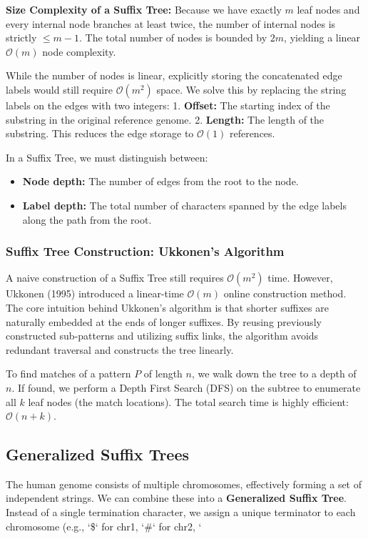 \documentclass[11pt,a4paper]{article}
\begin{document}
\textbf{Size Complexity of a Suffix Tree:}
Because we have exactly $m$ leaf nodes and every internal node branches at least twice, the number of internal nodes is strictly $\le m-1$. The total number of nodes is bounded by $2m$, yielding a linear $\mathcal{O}(m)$ node complexity.

While the number of nodes is linear, explicitly storing the concatenated edge labels would still require $\mathcal{O}(m^2)$ space. We solve this by replacing the string labels on the edges with two integers:
1. \textbf{Offset:} The starting index of the substring in the original reference genome.
2. \textbf{Length:} The length of the substring.
This reduces the edge storage to $\mathcal{O}(1)$ references.

In a Suffix Tree, we must distinguish between:
\begin{itemize}
    \item \textbf{Node depth:} The number of edges from the root to the node.
    \item \textbf{Label depth:} The total number of characters spanned by the edge labels along the path from the root.
\end{itemize}

\subsubsection{Suffix Tree Construction: Ukkonen's Algorithm}
A naive construction of a Suffix Tree still requires $\mathcal{O}(m^2)$ time. However, Ukkonen (1995) introduced a linear-time $\mathcal{O}(m)$ online construction method. 
The core intuition behind Ukkonen's algorithm is that shorter suffixes are naturally embedded at the ends of longer suffixes. By reusing previously constructed sub-patterns and utilizing suffix links, the algorithm avoids redundant traversal and constructs the tree linearly.

To find matches of a pattern $P$ of length $n$, we walk down the tree to a depth of $n$. If found, we perform a Depth First Search (DFS) on the subtree to enumerate all $k$ leaf nodes (the match locations). The total search time is highly efficient: $\mathcal{O}(n + k)$.

\subsection{Generalized Suffix Trees}
The human genome consists of multiple chromosomes, effectively forming a set of independent strings.
We can combine these into a \textbf{Generalized Suffix Tree}.
Instead of a single termination character, we assign a unique terminator to each chromosome (e.g., `\$` for chr1, `#` for chr2, `%
\end{document}
